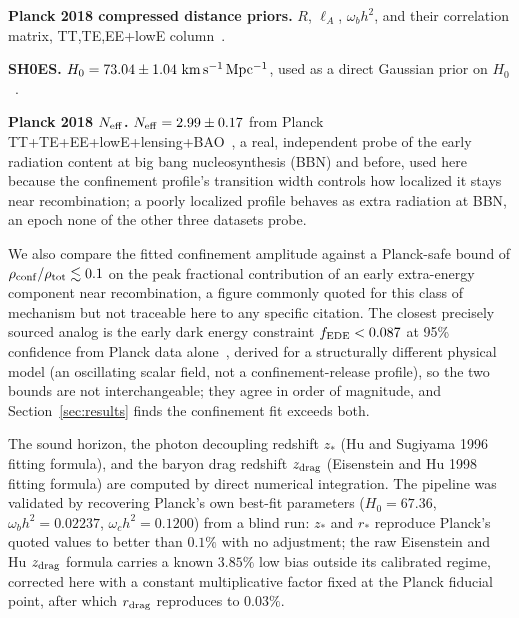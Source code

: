 \documentclass[11pt,a4paper,twocolumn]{article}
\begin{document}
\textbf{Planck 2018 compressed distance priors.} $R$, $\ell_A$, $\omega_b h^2$, and their correlation matrix, TT,TE,EE+lowE column~\cite{chen2019}.

\textbf{SH0ES.} $H_0 = 73.04 \pm 1.04\ {\rm km\,s^{-1}\,Mpc^{-1}}$, used as a direct Gaussian prior on $H_0$~\cite{riess2022}.

\textbf{Planck 2018 $N_{\rm eff}$.} $N_{\rm eff} = 2.99 \pm 0.17$ from Planck TT+TE+EE+lowE+lensing+BAO~\cite{planck2018}, a real, independent probe of the early radiation content at big bang nucleosynthesis (BBN) and before, used here because the confinement profile's transition width controls how localized it stays near recombination; a poorly localized profile behaves as extra radiation at BBN, an epoch none of the other three datasets probe.

We also compare the fitted confinement amplitude against a Planck-safe bound of $\rho_{\rm conf}/\rho_{\rm tot} \lesssim 0.1$ on the peak fractional contribution of an early extra-energy component near recombination, a figure commonly quoted for this class of mechanism but not traceable here to any specific citation. The closest precisely sourced analog is the early dark energy constraint $f_{\rm EDE} < 0.087$ at 95\% confidence from Planck data alone~\cite{hill2020}, derived for a structurally different physical model (an oscillating scalar field, not a confinement-release profile), so the two bounds are not interchangeable; they agree in order of magnitude, and Section~\ref{sec:results} finds the confinement fit exceeds both.

The sound horizon, the photon decoupling redshift $z_\ast$ (Hu and Sugiyama 1996 fitting formula), and the baryon drag redshift $z_{\rm drag}$ (Eisenstein and Hu 1998 fitting formula) are computed by direct numerical integration. The pipeline was validated by recovering Planck's own best-fit parameters ($H_0 = 67.36$, $\omega_b h^2 = 0.02237$, $\omega_c h^2 = 0.1200$) from a blind run: $z_\ast$ and $r_\ast$ reproduce Planck's quoted values to better than $0.1\%$ with no adjustment; the raw Eisenstein and Hu $z_{\rm drag}$ formula carries a known $3.85\%$ low bias outside its calibrated regime, corrected here with a constant multiplicative factor fixed at the Planck fiducial point, after which $r_{\rm drag}$ reproduces to $0.03\%$.
\end{document}
